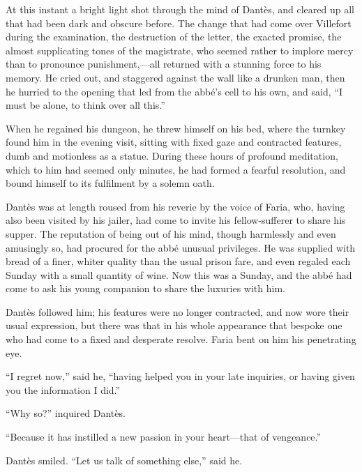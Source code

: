At this instant a bright light shot through the mind of Dantès, and
cleared up all that had been dark and obscure before. The change that
had come over Villefort during the examination, the destruction of the
letter, the exacted promise, the almost supplicating tones of the
magistrate, who seemed rather to implore mercy than to pronounce
punishment,—all returned with a stunning force to his memory. He cried
out, and staggered against the wall like a drunken man, then he hurried
to the opening that led from the abbé’s cell to his own, and said, “I
must be alone, to think over all this.”

When he regained his dungeon, he threw himself on his bed, where the
turnkey found him in the evening visit, sitting with fixed gaze and
contracted features, dumb and motionless as a statue. During these
hours of profound meditation, which to him had seemed only minutes, he
had formed a fearful resolution, and bound himself to its fulfilment by
a solemn oath.

Dantès was at length roused from his reverie by the voice of Faria,
who, having also been visited by his jailer, had come to invite his
fellow-sufferer to share his supper. The reputation of being out of his
mind, though harmlessly and even amusingly so, had procured for the
abbé unusual privileges. He was supplied with bread of a finer, whiter
quality than the usual prison fare, and even regaled each Sunday with a
small quantity of wine. Now this was a Sunday, and the abbé had come to
ask his young companion to share the luxuries with him.

Dantès followed him; his features were no longer contracted, and now
wore their usual expression, but there was that in his whole appearance
that bespoke one who had come to a fixed and desperate resolve. Faria
bent on him his penetrating eye.

“I regret now,” said he, “having helped you in your late inquiries, or
having given you the information I did.”

“Why so?” inquired Dantès.

“Because it has instilled a new passion in your heart—that of
vengeance.”

Dantès smiled. “Let us talk of something else,” said he.

